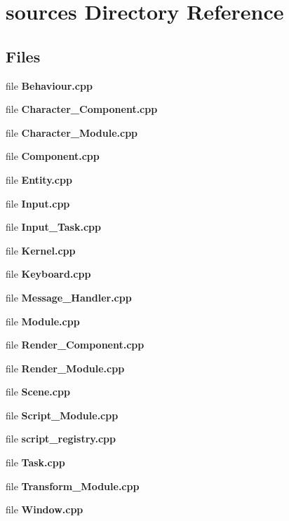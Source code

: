 \section{sources Directory Reference}
\label{dir_08d237fc27d4ecd563f71c5d52f2fecc}
\subsection*{Files}
\begin{DoxyCompactItemize}
\item 
file \textbf{ Behaviour.\+cpp}
\item 
file \textbf{ Character\+\_\+\+Component.\+cpp}
\item 
file \textbf{ Character\+\_\+\+Module.\+cpp}
\item 
file \textbf{ Component.\+cpp}
\item 
file \textbf{ Entity.\+cpp}
\item 
file \textbf{ Input.\+cpp}
\item 
file \textbf{ Input\+\_\+\+Task.\+cpp}
\item 
file \textbf{ Kernel.\+cpp}
\item 
file \textbf{ Keyboard.\+cpp}
\item 
file \textbf{ Message\+\_\+\+Handler.\+cpp}
\item 
file \textbf{ Module.\+cpp}
\item 
file \textbf{ Render\+\_\+\+Component.\+cpp}
\item 
file \textbf{ Render\+\_\+\+Module.\+cpp}
\item 
file \textbf{ Scene.\+cpp}
\item 
file \textbf{ Script\+\_\+\+Module.\+cpp}
\item 
file \textbf{ script\+\_\+registry.\+cpp}
\item 
file \textbf{ Task.\+cpp}
\item 
file \textbf{ Transform\+\_\+\+Module.\+cpp}
\item 
file \textbf{ Window.\+cpp}
\end{DoxyCompactItemize}
